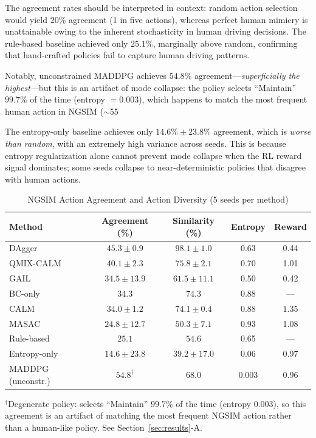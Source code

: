 \documentclass[journal]{IEEEtran}
\begin{document}
The agreement rates should be interpreted in context: random action selection would yield $20\%$ agreement (1 in five actions), whereas perfect human mimicry is unattainable owing to the inherent stochasticity in human driving decisions. The rule-based baseline achieved only $25.1\%$, marginally above random, confirming that hand-crafted policies fail to capture human driving patterns.

Notably, unconstrained MADDPG achieves $54.8\%$ agreement---\emph{superficially the highest}---but this is an artifact of mode collapse: the policy selects ``Maintain'' $99.7\%$ of the time (entropy $= 0.003$), which happens to match the most frequent human action in NGSIM ($\sim$55%

The entropy-only baseline achieves only $14.6\% \pm 23.8\%$ agreement, which is \emph{worse than random}, with an extremely high variance across seeds. This is because entropy regularization alone cannot prevent mode collapse when the RL reward signal dominates; some seeds collapse to near-deterministic policies that disagree with human actions.

\begin{table}[t]
\centering
\caption{NGSIM Action Agreement and Action Diversity (5 seeds per method)}
\label{tab:agreement}
\scriptsize
\setlength{\tabcolsep}{4pt}
\begin{tabular}{lcccc}
\toprule
\textbf{Method} & \textbf{Agreement (\%)} & \textbf{Similarity (\%)} & \textbf{Entropy} & \textbf{Reward} \\
\midrule
DAgger & $\mathbf{45.3 \pm 0.9}$ & $\mathbf{98.1 \pm 1.0}$ & 0.63 & 0.44 \\
QMIX-CALM & $40.1 \pm 2.3$ & $75.8 \pm 2.1$ & 0.70 & 1.01 \\
GAIL & $34.5 \pm 13.9$ & $61.5 \pm 11.1$ & 0.50 & 0.42 \\
BC-only & $34.3$ & $74.3$ & 0.88 & --- \\
CALM & $34.0 \pm 1.2$ & $74.1 \pm 0.4$ & 0.88 & $\mathbf{1.35}$ \\
MASAC & $24.8 \pm 12.7$ & $50.3 \pm 7.1$ & 0.93 & 1.08 \\
Rule-based & $25.1$ & $54.6$ & 0.65 & --- \\
Entropy-only & $14.6 \pm 23.8$ & $39.2 \pm 17.0$ & 0.06 & 0.97 \\
MADDPG (unconstr.) & $54.8^{\dagger}$ & $68.0$ & 0.003 & 0.96 \\
\bottomrule
\end{tabular}
\vspace{1mm}
\parbox{\columnwidth}{\scriptsize $^{\dagger}$Degenerate policy: selects ``Maintain'' $99.7\%$ of the time (entropy $0.003$), so this agreement is an artifact of matching the most frequent NGSIM action rather than a human-like policy. See Section~\ref{sec:results}-A.}
\end{table}
\end{document}
